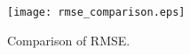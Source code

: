 \begin{figure}[h]
    \centering
    \texttt{[image: rmse\_comparison.eps]}
    \caption{Comparison of RMSE.}\label{rmse_comparison}
\end{figure}

